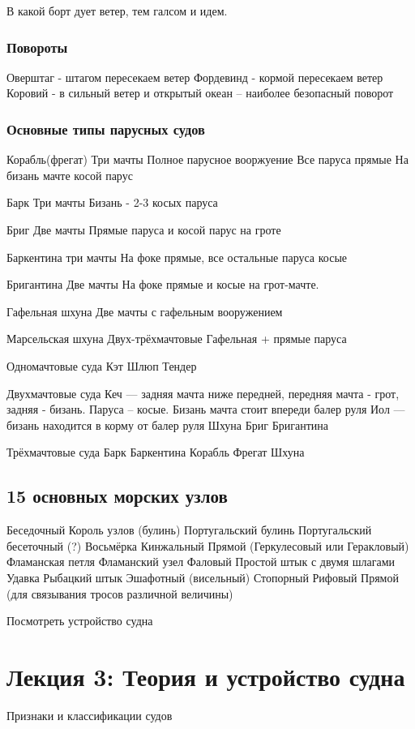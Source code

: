 \documentclass{article}        %
\begin{document}
В какой борт дует ветер, тем галсом и идем.

\subsubsection{Повороты}
Оверштаг - штагом пересекаем ветер
Фордевинд - кормой пересекаем ветер
Коровий - в сильный ветер и открытый океан -- наиболее безопасный поворот

\subsubsection{Основные типы парусных судов}
Корабль(фрегат)
Три мачты
Полное парусное вооржуение
Все паруса прямые
На бизань мачте косой парус

Барк
Три мачты
Бизань - 2-3 косых паруса

Бриг 
Две мачты
Прямые паруса и косой парус на гроте

Баркентина
три мачты
На фоке прямые, все остальные паруса косые

Бригантина
Две мачты
На фоке прямые и косые на грот-мачте.

Гафельная шхуна
Две мачты с гафельным вооружением

Марсельская шхуна
Двух-трёхмачтовые
Гафельная + прямые паруса



Одномачтовые суда
Кэт
Шлюп
Тендер

Двухмачтовые суда
Кеч --- задняя мачта ниже передней, передняя мачта - грот, задняя - бизань. Паруса -- косые. Бизань мачта стоит впереди балер руля
Иол --- бизань находится в корму от балер руля 
Шхуна
Бриг
Бригантина

Трёхмачтовые суда
Барк
Баркентина
Корабль
Фрегат
Шхуна

\subsection{15 основных морских узлов}
Беседочный Король узлов (булинь)
Португальский булинь Португальский бесеточный (?)
Восьмёрка
Кинжальный
Прямой (Геркулесовый или Геракловый)
Фламанская петля
Фламанский узел
Фаловый
Простой штык с двумя шлагами
Удавка
Рыбацкий штык
Эшафотный (висельный)
Стопорный
Рифовый
Прямой (для связывания тросов различной величины)

Посмотреть устройство судна

\section{Лекция 3: Теория и устройство судна}
Признаки и классификации судов
\end{document}
